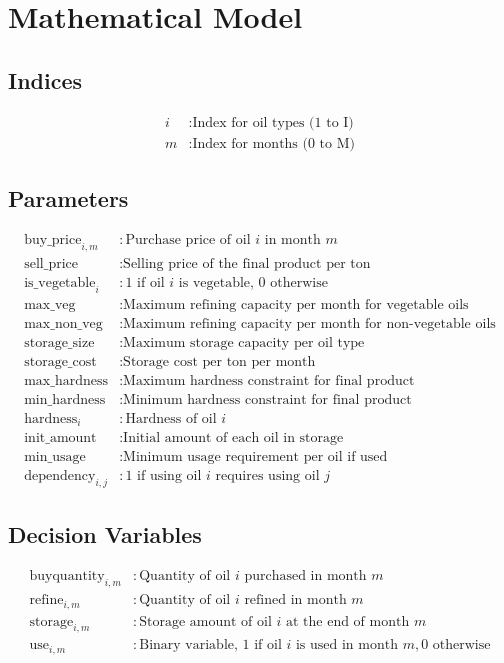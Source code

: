 \documentclass{article}
\begin{document}
\section*{Mathematical Model}

\subsection*{Indices}
\begin{align*}
i & : \text{Index for oil types (1 to I)} \\
m & : \text{Index for months (0 to M)} 
\end{align*}

\subsection*{Parameters}
\begin{align*}
\text{buy\_price}_{i,m} & : \text{Purchase price of oil } i \text{ in month } m \\
\text{sell\_price} & : \text{Selling price of the final product per ton} \\
\text{is\_vegetable}_i & : \text{1 if oil } i \text{ is vegetable, 0 otherwise} \\
\text{max\_veg} & : \text{Maximum refining capacity per month for vegetable oils} \\
\text{max\_non\_veg} & : \text{Maximum refining capacity per month for non-vegetable oils} \\
\text{storage\_size} & : \text{Maximum storage capacity per oil type} \\
\text{storage\_cost} & : \text{Storage cost per ton per month} \\
\text{max\_hardness} & : \text{Maximum hardness constraint for final product} \\
\text{min\_hardness} & : \text{Minimum hardness constraint for final product} \\
\text{hardness}_i & : \text{Hardness of oil } i \\
\text{init\_amount} & : \text{Initial amount of each oil in storage} \\
\text{min\_usage} & : \text{Minimum usage requirement per oil if used} \\
\text{dependency}_{i, j} & : \text{1 if using oil } i \text{ requires using oil } j
\end{align*}

\subsection*{Decision Variables}
\begin{align*}
\text{buyquantity}_{i,m} & : \text{Quantity of oil } i \text{ purchased in month } m \\
\text{refine}_{i,m} & : \text{Quantity of oil } i \text{ refined in month } m \\
\text{storage}_{i,m} & : \text{Storage amount of oil } i \text{ at the end of month } m \\
\text{use}_{i,m} & : \text{Binary variable, 1 if oil } i \text{ is used in month } m, \text{0 otherwise} 
\end{align*}
\end{document}
